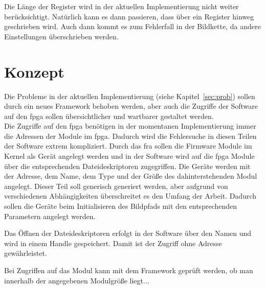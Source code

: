Die Länge der Register wird in der aktuellen Implementierung nicht weiter berücksichtigt. Natürlich kann es dann passieren, dass über ein Register hinweg geschrieben wird. Auch dann kommt es zum Fehlerfall in der Bildkette, da andere Einstellungen überschrieben werden. 
 
\section{Konzept}
Die Probleme in der aktuellen Implementierung (siehe Kapitel~\ref{sec:prob}) sollen durch ein neues Framework behoben werden, aber auch die Zugriffe der Software auf den \ac{fpga} sollen übersichtlicher und wartbarer gestaltet werden. \\

Die Zugriffe auf den \ac{fpga} benötigen in der momentanen Implementierung immer die Adressen der Module im \ac{fpga}. Dadurch wird die Fehlersuche in diesen Teilen der Software extrem kompliziert. Durch das \ac{fra} sollen die Firmware Module im Kernel als Gerät angelegt werden und in der Software wird auf die \ac{fpga} Module über die entsprechenden Dateideskriptoren zugegriffen. 
Die Geräte werden mit der Adresse, dem Name, dem Type und der Größe des dahinterstehenden Modul angelegt. Dieser Teil soll generisch generiert werden, aber aufgrund von verschiedenen Abhängigkeiten überschreitet es den Umfang der Arbeit. Dadurch sollen die Geräte beim Initialisieren des Bildpfads mit den entsprechenden Parametern angelegt werden.

Das Öffnen der Dateideskriptoren erfolgt in der Software über den Namen und wird in einem Handle gespeichert. Damit ist der Zugriff ohne Adresse gewährleistet. 

Bei Zugriffen auf das Modul kann mit dem Framework geprüft werden, ob man innerhalb der angegebenen Modulgröße liegt...

